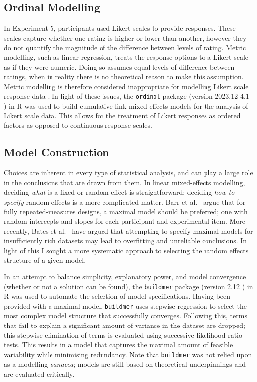 \documentclass[../main.tex]{subfiles}
\begin{document}
\subsection{Ordinal Modelling}\label{ordinal-modelling}

In Experiment 5, participants used Likert scales to provide responses.
These scales capture whether one rating is higher or lower than another,
however they do not quantify the magnitude of the difference between
levels of rating. Metric modelling, such as linear regression, treats
the response options to a Likert scale as if they were numeric. Doing so
assumes equal levels of difference between ratings, when in reality
there is no theoretical reason to make this assumption. Metric modelling
is therefore considered inappropriate for modelling Likert scale
response data \cite{liddell_2018}. In light of these issues, the
\texttt{ordinal} package (version 2023.12-4.1 \cite{ordinal}) in R was
used to build cumulative link mixed-effects models for the analysis of
Likert scale data. This allows for the treatment of Likert responses as
ordered factors as opposed to continuous response scales.

\subsection{Model Construction}\label{model-construction}

Choices are inherent in every type of statistical analysis, and can play
a large role in the conclusions that are drawn from them. In linear
mixed-effects modelling, deciding \emph{what} is a fixed or random
effect is straightforward; deciding \emph{how to specify} random effects
is a more complicated matter. Barr et al.~\cite{barr_2013} argue that
for fully repeated-measures designs, a maximal model should be
preferred; one with random intercepts and slopes for each participant
and experimental item. More recently, Bates et al.~\cite{bates_2018}
have argued that attempting to specify maximal models for insufficiently
rich datasets may lead to overfitting and unreliable conclusions. In
light of this I sought a more systematic approach to selecting the
random effects structure of a given model.

In an attempt to balance simplicity, explanatory power, and model
convergence (whether or not a solution can be found), the
\texttt{buildmer} package (version 2.12 \cite{buildmer}) in R was used
to automate the selection of model specifications. Having been provided
with a maximal model, \texttt{buildmer} uses stepwise regression to
select the most complex model structure that successfully converges.
Following this, terms that fail to explain a significant amount of
variance in the dataset are dropped; this stepwise elimination of terms
is evaluated using successive likelihood ratio tests. This results in a
model that captures the maximal amount of feasible variability while
minimising redundancy. Note that \texttt{buildmer} was not relied upon
as a modelling \emph{panacea}; models are still based on theoretical
underpinnings and are evaluated critically.
\end{document}

